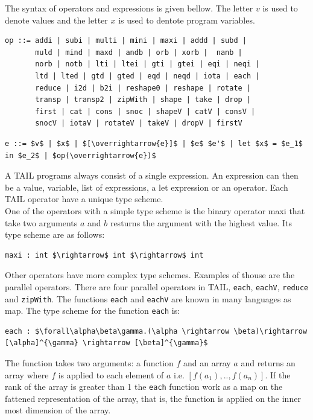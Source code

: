 \documentclass[11pt]{article}
\begin{document}
The syntax of operators and expressions is given bellow. The letter $v$ is used to denote values and the letter $x$ is used to dentote program variables. 
\begin{lstlisting}[numbers=none,frame=none]
op ::= addi | subi | multi | mini | maxi | addd | subd | 
       muld | mind | maxd | andb | orb | xorb |  nanb | 
       norb | notb | lti | ltei | gti | gtei | eqi | neqi |
       ltd | lted | gtd | gted | eqd | neqd | iota | each |
       reduce | i2d | b2i | reshape0 | reshape | rotate |
       transp | transp2 | zipWith | shape | take | drop |
       first | cat | cons | snoc | shapeV | catV | consV | 
       snocV | iotaV | rotateV | takeV | dropV | firstV 
\end{lstlisting}

\begin{lstlisting}[numbers=none,frame=none]
e ::= $v$ | $x$ | $[\overrightarrow{e}]$ | $e$ $e'$ | let $x$ = $e_1$ in $e_2$ | $op(\overrightarrow{e})$
\end{lstlisting}
A TAIL programs always consist of a single expression. An expression can then be a value, variable, 
list of expressions, a let expression or an operator. Each TAIL operator have a unique type scheme. \\

One of the operators with a simple type scheme is the binary operator maxi that take two arguments $a$ and $b$ resturns the argument with the highest value. Its type scheme are as follows:
\begin{lstlisting}[numbers=none,frame=none]
maxi : int $\rightarrow$ int $\rightarrow$ int
\end{lstlisting}

Other operators have more complex type schemes. Examples of thouse are the parallel operators. 
There are four parallel operators in TAIL, {\tt each}, {\tt eachV}, {\tt reduce} and {\tt zipWith}.
The functions {\tt each} and {\tt eachV} are known in many languages as map.
The type scheme for the function {\tt each} is:
\begin{lstlisting}[numbers=none,frame=none]
each : $\forall\alpha\beta\gamma.(\alpha \rightarrow \beta)\rightarrow [\alpha]^{\gamma} \rightarrow [\beta]^{\gamma}$
\end{lstlisting}
The function takes two arguments: a function $f$ and an array $a$ and returns an array where $f$ is applied to each element of $a$ i.e. $[f(a_1),..,f(a_n)]$.
If the rank of the array is greater than 1 the {\tt each} function work as a map on the fattened representation of the array,
that is, the function is applied on the inner most dimension of the array.
\end{document}
